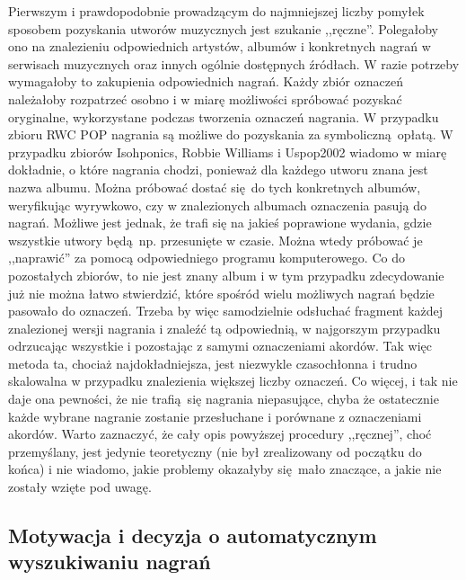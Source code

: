 Pierwszym i prawdopodobnie prowadzącym do najmniejszej liczby pomyłek sposobem pozyskania utworów muzycznych jest szukanie ,,ręczne''. Polegałoby ono na znalezieniu odpowiednich artystów, albumów i konkretnych nagrań w serwisach muzycznych oraz innych ogólnie dostępnych źródłach. W razie potrzeby wymagałoby to zakupienia odpowiednich nagrań. Każdy zbiór oznaczeń należałoby rozpatrzeć osobno i w miarę możliwości spróbować pozyskać oryginalne, wykorzystane podczas tworzenia oznaczeń nagrania. W przypadku zbioru RWC POP nagrania są możliwe do pozyskania za symboliczną opłatą. W przypadku zbiorów Isohponics, Robbie Williams i Uspop2002 wiadomo w miarę dokładnie, o które nagrania chodzi, ponieważ dla każdego utworu znana jest nazwa albumu. Można próbować dostać się do tych konkretnych albumów, weryfikując wyrywkowo, czy w znalezionych albumach oznaczenia pasują do nagrań. Możliwe jest jednak, że trafi się na jakieś poprawione wydania, gdzie wszystkie utwory będą np. przesunięte w czasie. Można wtedy próbować je ,,naprawić'' za pomocą odpowiedniego programu komputerowego. Co do pozostałych zbiorów, to nie jest znany album i w tym przypadku zdecydowanie już nie można łatwo stwierdzić, które spośród wielu możliwych nagrań będzie pasowało do oznaczeń. Trzeba by więc samodzielnie odsłuchać fragment każdej znalezionej wersji nagrania i znaleźć tą odpowiednią, w najgorszym przypadku odrzucając wszystkie i pozostając z samymi oznaczeniami akordów. Tak więc metoda ta, chociaż najdokładniejsza, jest niezwykle czasochłonna i trudno skalowalna w przypadku znalezienia większej liczby oznaczeń. Co więcej, i tak nie daje ona pewności, że nie trafią się nagrania niepasujące, chyba że ostatecznie każde wybrane nagranie zostanie przesłuchane i porównane z oznaczeniami akordów. Warto zaznaczyć, że cały opis powyższej procedury ,,ręcznej'', choć przemyślany, jest jedynie teoretyczny (nie był zrealizowany od początku do końca) i nie wiadomo, jakie problemy okazałyby się mało znaczące, a jakie nie zostały wzięte pod uwagę. 

\subsection{Motywacja i decyzja o automatycznym wyszukiwaniu nagrań}


